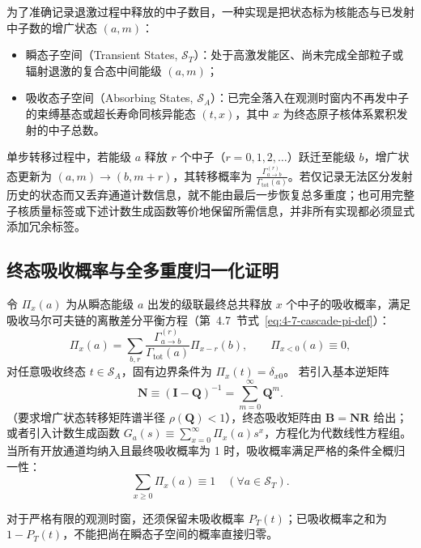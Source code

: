 为了准确记录退激过程中释放的中子数目，一种实现是把状态标为核能态与已发射中子数的增广状态 $(a,m)$：
\begin{itemize}
\item 瞬态子空间（Transient States, $\mathcal{S}_T$）：处于高激发能区、尚未完成全部粒子或辐射退激的复合态中间能级 $(a, m)$；
\item 吸收态子空间（Absorbing States, $\mathcal{S}_A$）：已完全落入在观测时窗内不再发中子的束缚基态或超长寿命同核异能态 $(t, x)$，其中 $x$ 为终态原子核体系累积发射的中子总数。
\end{itemize}
单步转移过程中，若能级 $a$ 释放 $r$ 个中子（$r = 0, 1, 2, \dots$）跃迁至能级 $b$，增广状态更新为 $(a, m) \to (b, m + r)$，其转移概率为 $\frac{\Gamma^{(r)}_{a \to b}}{\Gamma_{\mathrm{tot}}(a)}$。若仅记录无法区分发射历史的状态而又丢弃通道计数信息，就不能由最后一步恢复总多重度；也可用完整子核质量标签或下述计数生成函数等价地保留所需信息，并非所有实现都必须显式添加冗余标签。

\subsection{终态吸收概率与全多重度归一化证明}

令 $\Pi_x(a)$ 为从瞬态能级 $a$ 出发的级联最终总共释放 $x$ 个中子的吸收概率，满足吸收马尔可夫链的离散差分平衡方程（第~4.7~节式~\eqref{eq:4-7-cascade-pi-def}）：
\begin{equation}\label{eq:appD-pi-balance}
\Pi_x(a) = \sum_{b, r} \frac{\Gamma^{(r)}_{a \to b}}{\Gamma_{\mathrm{tot}}(a)} \Pi_{x-r}(b), \qquad \Pi_{x < 0}(a) \equiv 0,
\end{equation}
对任意吸收终态 $t \in \mathcal{S}_A$，固有边界条件为 $\Pi_x(t) = \delta_{x0}$。
若引入基本逆矩阵
\begin{equation}\label{eq:appD-fundamental-matrix}
\mathbf{N} \equiv (\mathbf{I} - \mathbf{Q})^{-1} = \sum_{m=0}^\infty \mathbf{Q}^m.
\end{equation}
（要求增广状态转移矩阵谱半径 $\rho(\mathbf{Q}) < 1$），终态吸收矩阵由 $\mathbf{B} = \mathbf{N} \mathbf{R}$ 给出；或者引入计数生成函数 $G_a(s) \equiv \sum_{x=0}^\infty \Pi_x(a) s^x$，方程化为代数线性方程组。
当所有开放通道均纳入且最终吸收概率为 1 时，吸收概率满足严格的条件全概归一性：
\begin{equation}\label{eq:appD-pi-sum-unity}
\sum_{x \ge 0} \Pi_x(a) \equiv 1 \quad (\forall a \in \mathcal{S}_T).
\end{equation}

对于严格有限的观测时窗，还须保留未吸收概率 $P_T(t)$；已吸收概率之和为 $1-P_T(t)$，不能把尚在瞬态子空间的概率直接归零。

